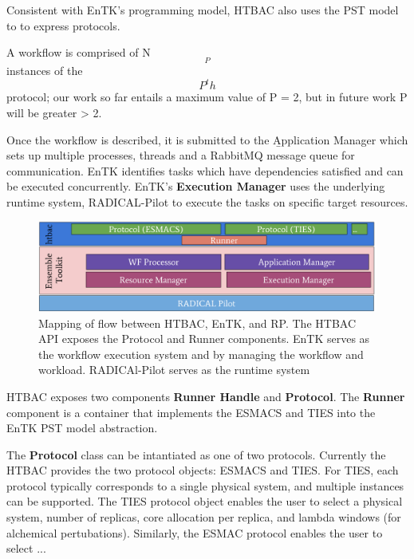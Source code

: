 Consistent with EnTK's programming model, HTBAC also uses the PST model to to
express  protocols.

A workflow is comprised of N$$_P$$ instances of the $$P^th$$ protocol; our
work so far entails a maximum value of P = 2, but in future work P will be
greater > 2.

Once the workflow is described, it is submitted to the \b{Application
Manager} which sets up multiple processes, threads and a RabbitMQ message
queue for communication. EnTK identifies tasks which have dependencies
satisfied and can be executed concurrently. EnTK's \textbf{Execution Manager}
uses the underlying runtime system, RADICAL-Pilot to execute the tasks on
specific target resources.

\begin{figure}
  \centering
   \includegraphics[width=\columnwidth]{figures/isc_htbac_integration_with_entk_RP.pdf}
  \caption{Mapping of flow between HTBAC, EnTK, and RP. The HTBAC API exposes the Protocol
  and Runner components. EnTK serves as the workflow execution system and
  by managing the workflow and workload. RADICAl-Pilot serves as the runtime system}
\label{fig:integration}
\end{figure}


HTBAC exposes two components \textbf{Runner Handle} and \textbf{Protocol}.
The \textbf{Runner} component is a container  that implements the ESMACS and TIES into the
EnTK PST model abstraction. 

The \textbf{Protocol} class can be intantiated as one of two protocols.
Currently the HTBAC provides the two protocol objects: ESMACS and TIES. For
TIES, each protocol typically corresponds to a single physical system, and
multiple instances can be supported. The TIES protocol object enables the user
to select a physical system, number of replicas, core allocation per replica,
and lambda windows (for alchemical pertubations). Similarly, the ESMAC
protocol enables the user to select ...


